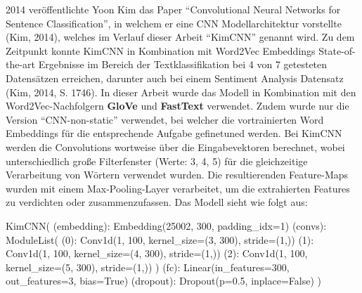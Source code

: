 \documentclass[11pt]{article}
\newenvironment{Shaded}{}{}
\newcommand{\DecValTok}[1]{\textcolor[rgb]{0.25,0.63,0.44}{{#1}}}
\newcommand{\FloatTok}[1]{\textcolor[rgb]{0.25,0.63,0.44}{{#1}}}
\newcommand{\NormalTok}[1]{{#1}}
\newcommand{\VariableTok}[1]{\textcolor[rgb]{0.10,0.09,0.49}{{#1}}}
\newcommand{\OperatorTok}[1]{\textcolor[rgb]{0.40,0.40,0.40}{{#1}}}
\begin{document}
2014 veröffentlichte Yoon Kim das Paper ``Convolutional Neural Networks
for Sentence Classification'', in welchem er eine CNN Modellarchitektur
vorstellte (Kim, 2014), welches im Verlauf dieser Arbeit ``KimCNN''
genannt wird. Zu dem Zeitpunkt konnte KimCNN in Kombination mit Word2Vec
Embeddings State-of-the-art Ergebnisse im Bereich der Textklassifikation
bei 4 von 7 getesteten Datensätzen erreichen, darunter auch bei einem
Sentiment Analysis Datensatz (Kim, 2014, S. 1746). In dieser Arbeit
wurde das Modell in Kombination mit den Word2Vec-Nachfolgern
\textbf{GloVe} und \textbf{FastText} verwendet. Zudem wurde nur die
Version ``CNN-non-static'' verwendet, bei welcher die vortrainierten
Word Embeddings für die entsprechende Aufgabe gefinetuned werden. Bei
KimCNN werden die Convolutions wortweise über die Eingabevektoren
berechnet, wobei unterschiedlich große Filterfenster (Werte: 3, 4, 5)
für die gleichzeitige Verarbeitung von Wörtern verwendet wurden. Die
resultierenden Feature-Maps wurden mit einem Max-Pooling-Layer
verarbeitet, um die extrahierten Features zu verdichten oder
zusammenzufassen. Das Modell sieht wie folgt aus:

\begin{Shaded}
\begin{Highlighting}[]
\NormalTok{KimCNN(}
\NormalTok{  (embedding): Embedding(}\DecValTok{25002}\NormalTok{, }\DecValTok{300}\NormalTok{, padding\_idx}\OperatorTok{=}\DecValTok{1}\NormalTok{)}
\NormalTok{  (convs): ModuleList(}
\NormalTok{    (}\DecValTok{0}\NormalTok{): Conv1d(}\DecValTok{1}\NormalTok{, }\DecValTok{100}\NormalTok{, kernel\_size}\OperatorTok{=}\NormalTok{(}\DecValTok{3}\NormalTok{, }\DecValTok{300}\NormalTok{), stride}\OperatorTok{=}\NormalTok{(}\DecValTok{1}\NormalTok{,))}
\NormalTok{    (}\DecValTok{1}\NormalTok{): Conv1d(}\DecValTok{1}\NormalTok{, }\DecValTok{100}\NormalTok{, kernel\_size}\OperatorTok{=}\NormalTok{(}\DecValTok{4}\NormalTok{, }\DecValTok{300}\NormalTok{), stride}\OperatorTok{=}\NormalTok{(}\DecValTok{1}\NormalTok{,))}
\NormalTok{    (}\DecValTok{2}\NormalTok{): Conv1d(}\DecValTok{1}\NormalTok{, }\DecValTok{100}\NormalTok{, kernel\_size}\OperatorTok{=}\NormalTok{(}\DecValTok{5}\NormalTok{, }\DecValTok{300}\NormalTok{), stride}\OperatorTok{=}\NormalTok{(}\DecValTok{1}\NormalTok{,))}
\NormalTok{  )}
\NormalTok{  (fc): Linear(in\_features}\OperatorTok{=}\DecValTok{300}\NormalTok{, out\_features}\OperatorTok{=}\DecValTok{3}\NormalTok{, bias}\OperatorTok{=}\VariableTok{True}\NormalTok{)}
\NormalTok{  (dropout): Dropout(p}\OperatorTok{=}\FloatTok{0.5}\NormalTok{, inplace}\OperatorTok{=}\VariableTok{False}\NormalTok{)}
\NormalTok{)}
\end{Highlighting}
\end{Shaded}
\end{document}
